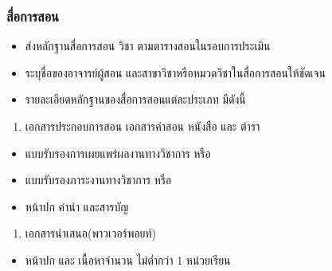 \documentclass[a4paper,12pt,english]{sphinxmanual}
\begin{document}
\subsubsection{สื่อการสอน}
\label{\detokenize{submission_part1:id5}}\begin{itemize}
\item {} 
ส่งหลักฐานสื่อการสอน  วิชา ตามตารางสอนในรอบการประเมิน

\item {} 
ระบุชื่อของอาจารย์ผู้สอน และสาขาวิชาหรือหมวดวิชาในสื่อการสอนให้ชัดเจน

\item {} 
รายละเอียดหลักฐานของสื่อการสอนแต่ละประเภท มีดังนี้

\end{itemize}
\begin{enumerate}
%
\item {} 
เอกสารประกอบการสอน เอกสารคำสอน หนังสือ และ ตำรา

\end{enumerate}
\begin{itemize}
\item {} 
แบบรับรองการเผยแพร่ผลงานทางวิชาการ  หรือ

\item {} 
แบบรับรองภาระงานทางวิชาการ  หรือ

\item {} 
หน้าปก คำนำ และสารบัญ

\end{itemize}
\begin{enumerate}
%
\setcounter{enumi}{1}
\item {} 
เอกสารนำเสนอ(พาวเวอร์พอยท์)

\end{enumerate}
\begin{itemize}
\item {} 
หน้าปก และ เนื้อหาจำนวน ไม่ต่ำกว่า 1 หน่วยเรียน

\end{itemize}
\end{document}
